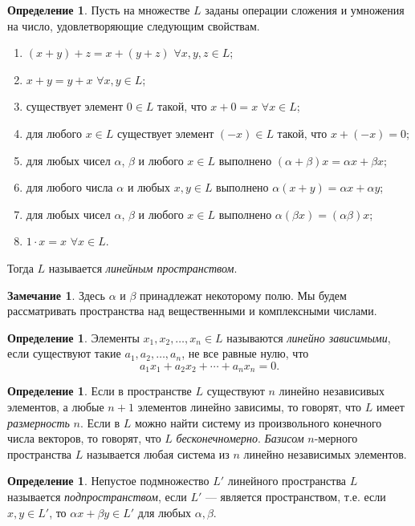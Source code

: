 \documentclass[12pt, titlepage, oneside]{amsbook}
\theoremstyle{definition}
\newtheorem{definition}[theorem]{Определение}
\newtheorem{remark}[theorem]{Замечание}
\theoremstyle{remark}
\begin{document}
\begin{definition}
	Пусть на множестве $L$ заданы операции сложения и умножения на число, удовлетворяющие следующим свойствам.
	\begin{enumerate}
		\item $(x+y)+z=x+(y+z)$ $\forall x,y,z\in L$;
		\item $x+y=y+x$ $\forall x,y\in L$;
		\item существует элемент $0\in L$ такой, что $x+0=x$ $\forall x\in L$;
		\item для любого $x\in L$ существует элемент $(-x)\in L$ такой, что $x+(-x)=0$;
		\item для любых чисел $\alpha$, $\beta$ и любого $x\in L$ выполнено $(\alpha+\beta)x=\alpha x+\beta x$;
		\item для любого числа $\alpha$ и любых $x,y\in L$ выполнено $\alpha(x+y)=\alpha x+\alpha y$;
		\item для любых чисел $\alpha$, $\beta$ и любого $x\in L$ выполнено $\alpha(\beta x)=(\alpha\beta) x$;
		\item $1\cdot x=x$ $\forall x\in L$.
	\end{enumerate}
	Тогда $L$ называется \emph{линейным пространством}.
\end{definition}


\begin{remark}
	Здесь $\alpha$ и $\beta$ принадлежат некоторому полю. Мы будем рассматривать пространства над вещественными и комплексными числами.
\end{remark}

\begin{definition}
	Элементы $x_1,x_2,\ldots, x_n\in L$ называются \emph{линейно зависимыми}, если существуют такие $a_1,a_2,\ldots, a_n$, не все равные нулю, что $$a_1x_1+a_2x_2+\cdots+a_nx_n=0.$$
\end{definition}

\begin{definition}
	Если в пространстве $L$ существуют $n$ линейно независивых элементов, а любые $n+1$ элементов линейно зависимы, то говорят, что $L$ имеет \emph{размерность} $n$. Если в $L$ можно найти систему из произвольного конечного числа векторов, то говорят, что $L$ \emph{бесконечномерно}. \emph{Базисом} $n$-мерного пространства $L$ называется любая система из $n$ линейно независимых элементов.
\end{definition}

\begin{definition}
	Непустое подмножество $L'$ линейного пространства $L$ называется \emph{подпространством}, если $L'$ --- является пространством, т.е. если $x,y\in L'$, то $\alpha x+\beta y\in L'$ для любых $\alpha,\beta$.
\end{definition}
\end{document}
